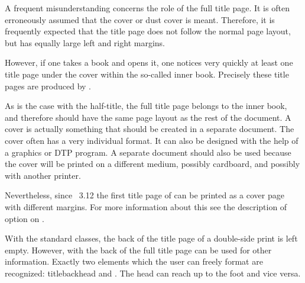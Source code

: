 \begin{Explain}
  A frequent misunderstanding concerns the role of the full title page.  It is
  often erroneously assumed that the cover or dust cover is
  meant.  Therefore, it is frequently expected that the title page does not
  follow the normal page layout, but has equally large left and right margins.

  However, if one takes a book and opens it, one notices very quickly at least
  one title page under the cover within the so-called inner book.  Precisely
  these title pages are produced by .

  As is the case with the half-title, the full title page belongs to the inner
  book, and therefore should have the same page layout as the rest of the
  document.  A cover is actually something that should be created in a
  separate document. The cover often has a very individual format. It can also
  be designed with the help of a graphics or DTP program. A separate document
  should also be used because the cover will be printed on a different medium,
  possibly cardboard, and possibly with another printer.

  Nevertheless, since \KOMAScript~3.12 the first title page of
   can be printed as a cover page with different margins. For
  more information about this see the description of option
   on .
\end{Explain}
%
\EndIndexGroup


\begin{Declaration}
\end{Declaration}%
With the standard classes, the back of the title page of a double-side print
is left empty.  However, with {\KOMAScript} the back of the full title page
can be used for other information. Exactly two elements which the user can
freely format are recognized: \PName
{titlebackhead}
and . The head can reach up to the foot and vice
versa. %
%
\EndIndexGroup


